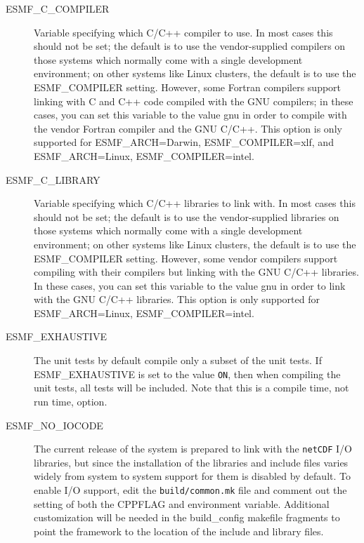 \begin{itemize}
\begin{description}
\item[ESMF\_C\_COMPILER]

Variable specifying which C/C++ compiler to use.   In most cases
this should not be set; the default is to use the vendor-supplied
compilers on those systems which normally come with a single 
development environment; on other systems like Linux clusters,
the default is to use the ESMF\_COMPILER setting.  However, some
Fortran compilers support linking with C and C++ code compiled
with the GNU compilers; in these cases, you can set this variable
to the value gnu in order to compile with the vendor Fortran
compiler and the GNU C/C++.   This option is only supported for
ESMF\_ARCH=Darwin, ESMF\_COMPILER=xlf, and ESMF\_ARCH=Linux,
ESMF\_COMPILER=intel.

\item[ESMF\_C\_LIBRARY]

Variable specifying which C/C++ libraries to link with.  In most cases
this should not be set; the default is to use the vendor-supplied
libraries on those systems which normally come with a single 
development environment; on other systems like Linux clusters,
the default is to use the ESMF\_COMPILER setting.  However, some
vendor compilers support compiling with their compilers but linking
with the GNU C/C++ libraries.
In these cases, you can set this variable
to the value gnu in order to link with the GNU C/C++ libraries.
This option is only supported for ESMF\_ARCH=Linux, ESMF\_COMPILER=intel.

\item[ESMF\_EXHAUSTIVE]

The unit tests by default compile only a subset of the unit tests.
If ESMF\_EXHAUSTIVE is set to the value {\tt ON}, then when
compiling the unit tests, all tests will be included.  Note that this
is a compile time, not run time, option.

\item[ESMF\_NO\_IOCODE]

The current release of the system is prepared to link with the
{\tt netCDF} I/O libraries, but since the installation of the
libraries and include files varies widely from system to system
support for them is disabled by default.  To enable I/O support,
edit the {\tt build/common.mk} file and comment out the setting
of both the CPPFLAG and environment variable.  Additional customization
will be needed in the build\_config makefile fragments to point the
framework to the location of the include and library files.


\end{description}
\end{itemize}
